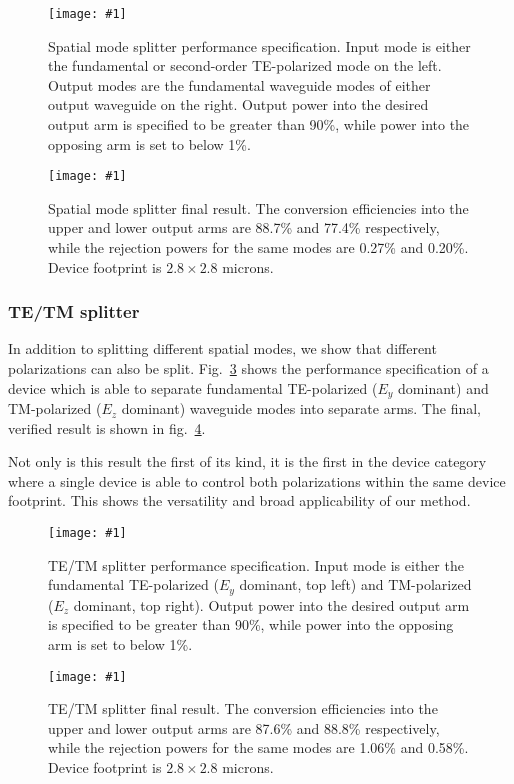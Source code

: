 \documentclass[letterpaper,10pt]{article}
\newcommand{\myfig}[2]{
    \begin{figure}[!h]
    \begin{centering}
    \texttt{[image: \#1]}
    \caption{#2}\label{#1}
    \end{centering}
    \end{figure}
}
\newcommand{\Fig}[1]{Fig.~\ref{#1}}
\newcommand{\fig}[1]{fig.~\ref{#1}}
\begin{document}
\myfig{3Db_spl_modal}
    {Spatial mode splitter performance specification.
    Input mode is either the fundamental or second-order
        TE-polarized mode on the left.
    Output modes are the fundamental waveguide modes of either output 
        waveguide on the right.
    Output power into the desired output arm is specified to be greater than 90\%,
        while power into the opposing arm is set to below 1\%.}
\myfig{spl_modal}
    {Spatial mode splitter final result.
    The conversion efficiencies into the upper and lower output arms
        are 88.7\% and 77.4\% respectively, 
        while the rejection powers for the same modes are 0.27\% and 0.20\%.
    Device footprint is $2.8\times2.8$ microns.}

\subsubsection{TE/TM splitter}
In addition to splitting different spatial modes, 
    we show that different polarizations can also be split.
\Fig{3Db_spl_tetm} shows the performance specification of a 
    device which is able to separate fundamental TE-polarized ($E_y$ dominant)
    and TM-polarized ($E_z$ dominant)
    waveguide modes into separate arms.
The final, verified result is shown in \fig{spl_tetm}.

Not only is this result the first of its kind,
    it is the first in the device category where a single device
    is able to control both polarizations within the same device footprint.
This shows the versatility and broad applicability of our method.

\myfig{3Db_spl_tetm}
    {TE/TM splitter performance specification.
    Input mode is either the fundamental TE-polarized ($E_y$ dominant, top left)
    and TM-polarized ($E_z$ dominant, top right).
    Output power into the desired output arm is specified to be greater than 90\%,
        while power into the opposing arm is set to below 1\%.}
\myfig{spl_tetm}
    {TE/TM splitter final result.
    The conversion efficiencies into the upper and lower output arms
        are 87.6\% and 88.8\% respectively, 
        while the rejection powers for the same modes are 1.06\% and 0.58\%.
    Device footprint is $2.8\times2.8$ microns.}
\end{document}
